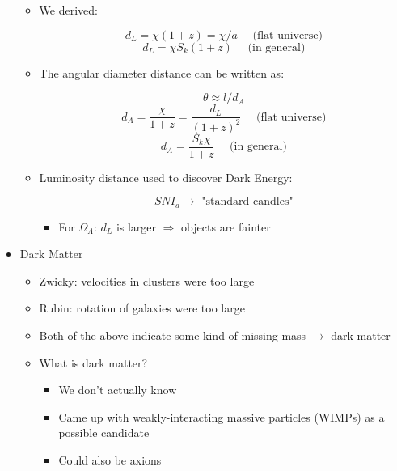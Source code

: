 \begin{itemize}
\begin{itemize}
      \item We derived:

        $$d_L=\chi(1+z)=\chi/a\quad\text{ (flat universe)}$$
        $$d_L=\chi S_k(1+z)\quad\text{ (in general)}$$

      \item The angular diameter distance can be written as:

        $$\theta\approx l/d_A$$
        $$d_A=\frac{\chi}{1+z}=\frac{d_L}{(1+z)^2}\quad\text{ (flat universe)}$$
        $$d_A=\frac{S_k\chi}{1+z}\quad\text{ (in general)}$$

      \item Luminosity distance used to discover Dark Energy:

        $$SNI_a\to\text{ "standard candles"}$$

        \begin{itemize}

          \item For $\Omega_{\Lambda}$: $d_L$ is larger $\Rightarrow$ objects are fainter

        \end{itemize}

    \end{itemize}

  \item Dark Matter

    \begin{itemize}

      \item Zwicky: velocities in clusters were too large

      \item Rubin: rotation of galaxies were too large

      \item Both of the above indicate some kind of missing mass $\to$ dark matter

      \item What is dark matter?

        \begin{itemize}

          \item We don't actually know

          \item Came up with weakly-interacting massive particles (WIMPs) as a possible candidate

          \item Could also be axions


\end{itemize}
\end{itemize}
\end{itemize}
